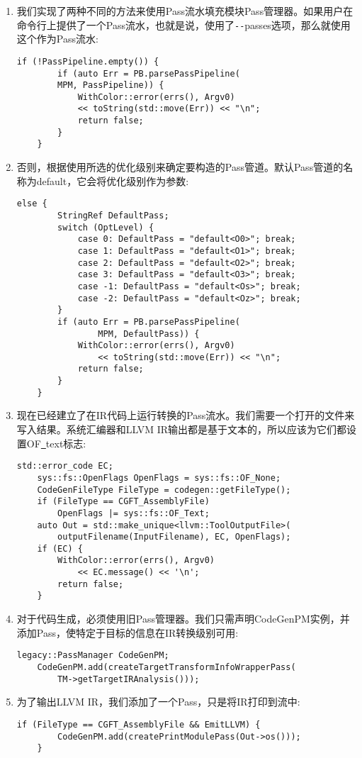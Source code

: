 \begin{enumerate}
\item 我们实现了两种不同的方法来使用Pass流水填充模块Pass管理器。如果用户在命令行上提供了一个Pass流水，也就是说，使用了\verb|--|passes选项，那么就使用这个作为Pass流水:
\begin{lstlisting}[caption={}]
	if (!PassPipeline.empty()) {
		if (auto Err = PB.parsePassPipeline(
		MPM, PassPipeline)) {
			WithColor::error(errs(), Argv0)
			<< toString(std::move(Err)) << "\n";
			return false;
		}
	}
\end{lstlisting}

\item 否则，根据使用所选的优化级别来确定要构造的Pass管道。默认Pass管道的名称为default，它会将优化级别作为参数:
\begin{lstlisting}[caption={}]
	else {
		StringRef DefaultPass;
		switch (OptLevel) {
			case 0: DefaultPass = "default<O0>"; break;
			case 1: DefaultPass = "default<O1>"; break;
			case 2: DefaultPass = "default<O2>"; break;
			case 3: DefaultPass = "default<O3>"; break;
			case -1: DefaultPass = "default<Os>"; break;
			case -2: DefaultPass = "default<Oz>"; break;
		}
		if (auto Err = PB.parsePassPipeline(
				MPM, DefaultPass)) {
			WithColor::error(errs(), Argv0)
				<< toString(std::move(Err)) << "\n";
			return false;
		}
	}
\end{lstlisting}

\item 现在已经建立了在IR代码上运行转换的Pass流水。我们需要一个打开的文件来写入结果。系统汇编器和LLVM IR输出都是基于文本的，所以应该为它们都设置OF\underline{~}text标志:
\begin{lstlisting}[caption={}]
	std::error_code EC;
	sys::fs::OpenFlags OpenFlags = sys::fs::OF_None;
	CodeGenFileType FileType = codegen::getFileType();
	if (FileType == CGFT_AssemblyFile)
		OpenFlags |= sys::fs::OF_Text;
	auto Out = std::make_unique<llvm::ToolOutputFile>(
		outputFilename(InputFilename), EC, OpenFlags);
	if (EC) {
		WithColor::error(errs(), Argv0)
			<< EC.message() << '\n';
		return false;
	}
\end{lstlisting}

\item 对于代码生成，必须使用旧Pass管理器。我们只需声明CodeGenPM实例，并添加Pass，使特定于目标的信息在IR转换级别可用:
\begin{lstlisting}[caption={}]
	legacy::PassManager CodeGenPM;
	CodeGenPM.add(createTargetTransformInfoWrapperPass(
		TM->getTargetIRAnalysis()));
\end{lstlisting}

\item 为了输出LLVM IR，我们添加了一个Pass，只是将IR打印到流中:
\begin{lstlisting}[caption={}]
	if (FileType == CGFT_AssemblyFile && EmitLLVM) {
		CodeGenPM.add(createPrintModulePass(Out->os()));
	}
\end{lstlisting}


\end{enumerate}
